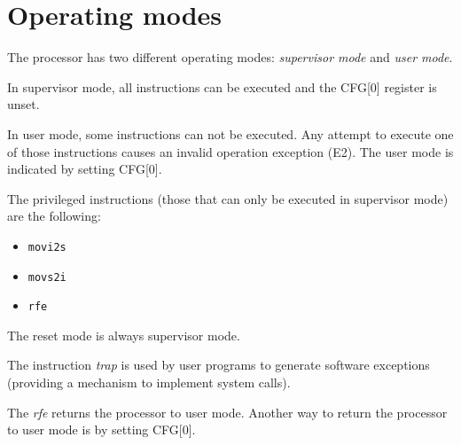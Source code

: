 \section{Operating modes}
\label{sec:modes}
The processor has two different operating modes: \emph{supervisor mode}
and \emph{user mode}.

In supervisor mode, all instructions can be executed and the CFG[0]
register is unset.

In user mode, some instructions can not be executed. Any attempt to execute
one of those instructions causes an invalid operation exception (E2). The user
mode is indicated by setting CFG[0].

The privileged instructions (those that can only be executed in supervisor mode)
are the following:

\begin{itemize}
\item \texttt{movi2s}
\item \texttt{movs2i}
\item \texttt{rfe}
\end{itemize}

The reset mode is always supervisor mode.

The instruction \emph{trap} is used by user programs to generate software exceptions (providing a mechanism to implement system calls).

The \emph{rfe} returns the processor to user mode. Another way to return the processor
to user mode is by setting CFG[0].
